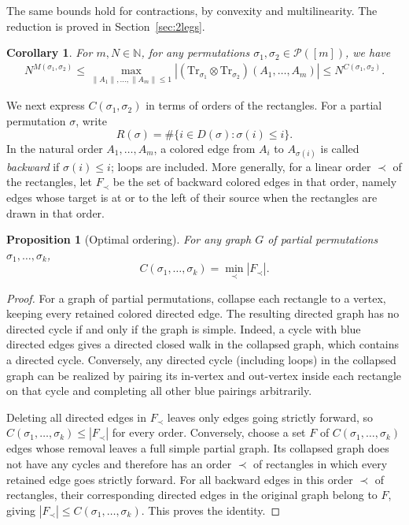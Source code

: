 \documentclass[12pt]{article}
\numberwithin{equation}{section}
\theoremstyle{plain}
\newtheorem{corollary}[theorem]{Corollary}
\newtheorem{proposition}[theorem]{Proposition}
\def\bN{\mathbb N}
\def\cP{\mathcal P}
\def\Tr{\mathrm {Tr}}
\begin{document}
The same bounds hold for contractions, by convexity and multilinearity. The reduction is proved in Section~\ref{sec:2legs}.

\begin{corollary} \label{Coro-main-2 leg}
For $m,N \in \bN$, for any permutations $\sigma_1,\sigma_2 \in \cP([m])$, we have
\begin{align*}
    N^{M(\sigma_1,\sigma_2)} \le
    \max_{\|A_1\|,\ldots,\|A_m\| \le 1} \left| \left( \Tr_{\sigma_1} \otimes \Tr_{\sigma_2} \right) \left( A_1, \ldots, A_m \right) \right|
    \le N^{C(\sigma_1,\sigma_2)}.
\end{align*}
\end{corollary}

We next express $C(\sigma_1,\sigma_2)$ in terms of orders of the rectangles. For a partial permutation $\sigma$, write
\[
R(\sigma)=\#\{i\in D(\sigma):\sigma(i)\le i\}.
\]
In the natural order $A_1,\ldots,A_m$, a colored edge from $A_i$ to $A_{\sigma(i)}$ is called \emph{backward} if $\sigma(i)\le i$; loops are included. More generally, for a linear order $\prec$ of the rectangles, let $F_\prec$ be the set of backward colored edges in that order, namely edges whose target is at or to the left of their source when the rectangles are drawn in that order.

\begin{proposition}[Optimal ordering]\label{Prop-cut-order}
For any graph $G$ of partial permutations $\sigma_1,\ldots,\sigma_k$,
\begin{equation}
C(\sigma_1,\ldots,\sigma_k)=\min_\prec |F_\prec|.
\end{equation}
\end{proposition}
\begin{proof}
For a graph of partial permutations, collapse each rectangle to a vertex, keeping every retained colored directed edge. The resulting directed graph has no directed cycle if and only if the graph is simple.
Indeed, a cycle with blue directed edges gives a directed closed walk in the collapsed graph, which contains a directed cycle. Conversely, any directed cycle (including loops) in the collapsed graph can be realized by pairing its in-vertex and out-vertex inside each rectangle on that cycle and completing all other blue pairings arbitrarily.

Deleting all directed edges in $F_\prec$ leaves only edges going strictly forward, so $C(\sigma_1,\ldots,\sigma_k)\le |F_\prec|$ for every order. Conversely, choose a set $F$ of $C(\sigma_1,\ldots,\sigma_k)$ edges whose removal leaves a full simple partial graph. Its collapsed graph does not have any cycles and therefore has an order $\prec$ of rectangles in which every retained edge goes strictly forward. For all backward edges in this order $\prec$ of rectangles, their corresponding directed edges in the original graph belong to $F$, giving $|F_\prec|\le C(\sigma_1,\ldots,\sigma_k)$. This proves the identity.
\end{proof}
\end{document}
